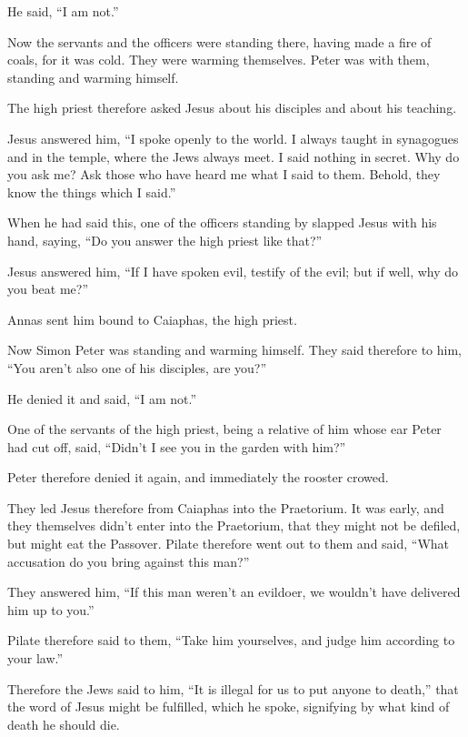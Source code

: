 He said, ``I am not.''

 Now the servants and the officers were standing there,
having made a fire of coals, for it was cold. They were warming
themselves. Peter was with them, standing and warming himself.

 The high priest therefore asked Jesus about his
disciples and about his teaching.

 Jesus answered him, ``I spoke openly to the world. I
always taught in synagogues and in the temple, where the Jews always
meet. I said nothing in secret.  Why do you ask me? Ask
those who have heard me what I said to them. Behold, they know the
things which I said.''

 When he had said this, one of the officers standing by
slapped Jesus with his hand, saying, ``Do you answer the high priest
like that?''

 Jesus answered him, ``If I have spoken evil, testify of
the evil; but if well, why do you beat me?''

 Annas sent him bound to Caiaphas, the high priest.

 Now Simon Peter was standing and warming himself. They
said therefore to him, ``You aren't also one of his disciples, are
you?''

He denied it and said, ``I am not.''

 One of the servants of the high priest, being a relative
of him whose ear Peter had cut off, said, ``Didn't I see you in the
garden with him?''

 Peter therefore denied it again, and immediately the
rooster crowed.

 They led Jesus therefore from Caiaphas into the
Praetorium. It was early, and they themselves didn't enter into the
Praetorium, that they might not be defiled, but might eat the Passover.
 Pilate therefore went out to them and said, ``What
accusation do you bring against this man?''

 They answered him, ``If this man weren't an evildoer, we
wouldn't have delivered him up to you.''

 Pilate therefore said to them, ``Take him yourselves,
and judge him according to your law.''

Therefore the Jews said to him, ``It is illegal for us to put anyone to
death,''  that the word of Jesus might be fulfilled,
which he spoke, signifying by what kind of death he should die.

